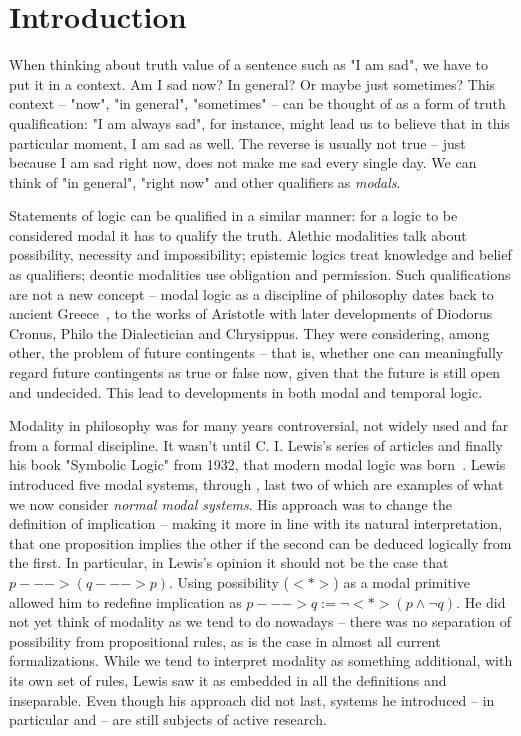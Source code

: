 \chapter{Introduction}\label{chapter:intro}

When thinking about truth value of a sentence such as "I am sad", we have to put it in a context. Am I sad now? In general? Or maybe just sometimes? This context -- "now", "in general", "sometimes" -- can be thought of as a form of truth qualification: "I am always sad", for instance, might lead us to believe that in this particular moment, I am sad as well. The reverse is usually not true -- just because I am sad right now, does not make me sad every single day. We can think of "in general", "right now" and other qualifiers as \emph{modals}.

Statements of logic can be qualified in a similar manner: for a logic to be considered modal it has to qualify the truth. Alethic modalities talk about possibility, necessity and impossibility; epistemic logics treat knowledge and belief as qualifiers; deontic modalities use obligation and permission. Such qualifications are not a new concept --  modal logic as a discipline of philosophy dates back to ancient Greece~\cite{sep-modality-medieval}, to the works of Aristotle with later developments of Diodorus Cronus, Philo the Dialectician and Chrysippus. They were considering, among other, the problem of future contingents -- that is, whether one can meaningfully regard future contingents as true or false now, given that the future is still open and undecided. This lead to developments in both modal and temporal logic.

Modality in philosophy was for many years controversial, not widely used and far from a formal discipline. It wasn't until C. I. Lewis's series of articles and finally his book "Symbolic Logic" from 1932, that modern modal logic was born~\cite{sep-logic-modal-origins}. Lewis introduced five modal systems, \logicSone{} through \logicSfive{}, last two of which are examples of what we now consider \emph{normal modal systems}. His approach was to change the definition of implication -- making it more in line with its natural interpretation, that one proposition implies the other if the second can be deduced logically from the first. In particular, in Lewis's opinion it should not be the case that $ p ---> ( q ---> p) $. Using possibility ($<*>$) as a modal primitive allowed him to redefine implication as $p --->q := \neg <*>(p \wedge \neg q)$. He did not yet think of modality as we tend to do nowadays -- there was no separation of possibility from propositional rules, as is the case in almost all current formalizations. While we tend to interpret modality as something additional, with its own set of rules, Lewis saw it as embedded in all the definitions and inseparable. Even though his approach did not last, systems he introduced -- in particular \logicSfour{} and \clogic{} -- are still subjects of active research.

